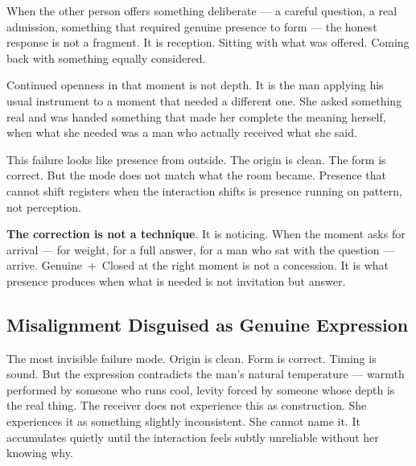 When the other person offers something deliberate --- a careful question, a real admission, something that required genuine presence to form --- the honest response is not a fragment. It is reception. Sitting with what was offered. Coming back with something equally considered.

Continued openness in that moment is not depth. It is the man applying his usual instrument to a moment that needed a different one. She asked something real and was handed something that made her complete the meaning herself, when what she needed was a man who actually received what she said.

This failure looks like presence from outside. The origin is clean. The form is correct. But the mode does not match what the room became. Presence that cannot shift registers when the interaction shifts is presence running on pattern, not perception.

\textbf{The correction is not a technique}. It is noticing. When the moment asks for arrival --- for weight, for a full answer, for a man who sat with the question --- arrive. Genuine~+~Closed at the right moment is not a concession. It is what presence produces when what is needed is not invitation but answer.

\subsection{Misalignment Disguised as Genuine Expression}
The most invisible failure mode. Origin is clean. Form is correct. 
Timing is sound. But the expression contradicts the man's natural temperature — warmth performed 
by someone who runs cool, levity forced by someone whose depth is the real thing. The receiver 
does not experience this as construction. She experiences it as something slightly inconsistent. 
She cannot name it. It accumulates quietly until the interaction feels subtly unreliable 
without her knowing why.